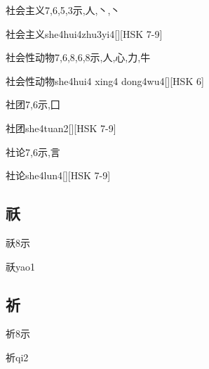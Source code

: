 \begin{Entry}{社会主义}{7,6,5,3}{⽰,⼈,⼂,⼂}
  \begin{Phonetics}{社会主义}{she4hui4zhu3yi4}[][HSK 7-9]
  \end{Phonetics}
\end{Entry}

\begin{Entry}{社会性动物}{7,6,8,6,8}{⽰,⼈,⼼,⼒,⽜}
  \begin{Phonetics}{社会性动物}{she4hui4 xing4 dong4wu4}[][HSK 6]
  \end{Phonetics}
\end{Entry}

\begin{Entry}{社团}{7,6}{⽰,⼞}
  \begin{Phonetics}{社团}{she4tuan2}[][HSK 7-9]
  \end{Phonetics}
\end{Entry}

\begin{Entry}{社论}{7,6}{⽰,⾔}
  \begin{Phonetics}{社论}{she4lun4}[][HSK 7-9]
  \end{Phonetics}
\end{Entry}

\subsection*{祅}

\begin{Entry}{祅}{8}{⽰}
  \begin{Phonetics}{祅}{yao1}
  \end{Phonetics}
\end{Entry}

\subsection*{祈}

\begin{Entry}{祈}{8}{⽰}
  \begin{Phonetics}{祈}{qi2}
  \end{Phonetics}
\end{Entry}

